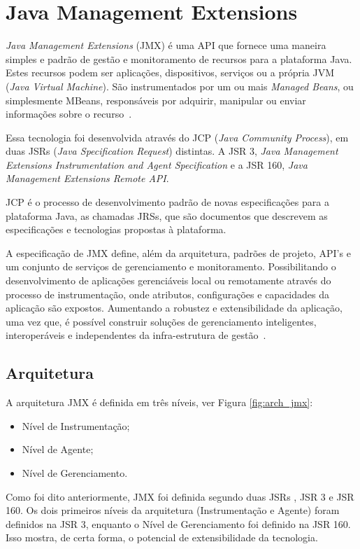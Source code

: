 \chapter{Java Management Extensions}
\label{ch:4}
\textit{Java Management Extensions} (JMX) é uma API que fornece uma maneira simples e padrão de gestão e monitoramento de recursos para a plataforma Java. Estes recursos podem ser aplicações, dispositivos, serviços ou a própria JVM (\textit{Java Virtual Machine}). São instrumentados por um ou mais \textit{Managed Beans}, ou simplesmente MBeans, responsáveis por adquirir, manipular ou enviar informações sobre o recurso~\cite{lindfors2002jmx}.

Essa tecnologia foi desenvolvida através do JCP (\textit{Java Community Process}), em duas JSRs (\textit{Java Specification Request}) distintas. A JSR 3, \textit{Java Management Extensions Instrumentation and Agent Specification} e a JSR 160, \textit{Java Management Extensions Remote API}.

JCP é o processo de desenvolvimento padrão de novas especificações para a plataforma Java, as chamadas JRSs, que são documentos que descrevem as especificações e tecnologias propostas à plataforma.

A especificação de JMX define, além da arquitetura, padrões de projeto, API's e um conjunto de serviços de gerenciamento e monitoramento. Possibilitando o desenvolvimento de aplicações gerenciáveis local ou remotamente através do processo de instrumentação, onde atributos, configurações e capacidades da aplicação são expostos. Aumentando a robustez e extensibilidade da aplicação, uma vez que, é possível construir soluções de gerenciamento inteligentes, interoperáveis e independentes da infra-estrutura de gestão~\cite{jmx}.
\newpage

\section{Arquitetura}

A arquitetura JMX é definida em três níveis, ver Figura \ref{fig:arch_jmx}:

\begin{itemize}
 \item Nível de Instrumentação;
 \item Nível de Agente;
 \item Nível de Gerenciamento.
\end{itemize}

Como foi dito anteriormente, JMX foi definida segundo duas JSRs , JSR 3 e JSR 160. Os dois primeiros níveis da arquitetura (Instrumentação e Agente) foram definidos na JSR 3, enquanto o Nível de Gerenciamento foi definido na JSR 160. Isso mostra, de certa forma, o potencial de extensibilidade da tecnologia.
\newline

